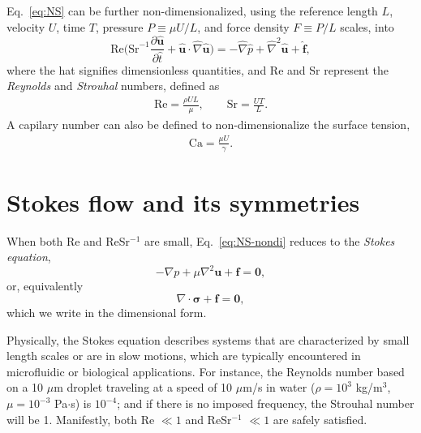 Eq.\ \eqref{eq:NS} can be further non-dimensionalized, using the reference length $L$, velocity $U$, time $T$, pressure $P \equiv \mu U/L$, and force density $F \equiv P/L$ scales, into
\begin{equation}
   \textrm{Re} \bigg(\textrm{Sr}^{-1} \frac{\partial \hat{\bm u}}{\partial \hat{t}} + \hat{\bm u} \cdot \hat{\nabla} \hat{\bm u} \bigg) =
   -\hat{\nabla} \hat{p} + \hat{\nabla} ^2  \hat{\bm u} + \hat{\bm f},
  \label{eq:NS-nondi}
\end{equation}
where the hat signifies dimensionless quantities, and Re and Sr represent the \emph{Reynolds} and \emph{Strouhal} numbers, defined as
\begin{equation}
  \begin{aligned}
    \textrm{Re} = \frac{\rho UL}{\mu},\quad \quad \textrm{Sr} = \frac{UT}{L}.
  \end{aligned}
\end{equation}
A capilary number can also be defined to non-dimensionalize the surface tension,
\begin{equation}
  \begin{aligned}
    \textrm{Ca} = \frac{\mu U}{\gamma}.
  \end{aligned}
\end{equation}




\section{Stokes flow and its symmetries}
\label{sec:stokes-flows}

When both Re and ReSr$^{-1}$ are small, Eq.\ \eqref{eq:NS-nondi} reduces to the \emph{Stokes equation},
\begin{equation}
   -\nabla p + \mu \nabla ^2  {\bm u} + {\bm f} = {\bm 0},
 \label{eq:Stokes}
\end{equation}
or, equivalently
\begin{equation}
   \nabla \cdot  {\bm \sigma} + {\bm f} = {\bm 0},
 \label{eq:Stokes1}
\end{equation}
which we write in the dimensional form.

Physically, the Stokes equation describes systems that are characterized by small length scales or are in slow motions, which are typically encountered in microfluidic or biological applications.
For instance, the Reynolds number based on a 10 $\mu$m droplet traveling at a speed of 10 $\mu$m/s in water ($\rho=10^3$ kg/m$^{3}$, $\mu=10^{-3}$ Pa$\cdot$s) is $10^{-4}$;
and if there is no imposed frequency, the Strouhal number will be 1.
Manifestly, both Re $\ll 1$ and ReSr$^{-1}$ $\ll 1$ are safely satisfied.

